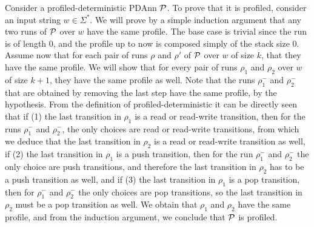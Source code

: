 %
%
%

Consider a profiled-deterministic PDAnn $\mathcal{P}$. To prove that it is profiled, consider an input string $w\in \Sigma^*$. We will prove by a simple induction argument that any two runs of $\mathcal{P}$ over $w$ have the same profile. The base case is trivial since the run is of length 0, and the profile up to now is composed simply of the stack size 0. Assume now that for each pair of runs $\rho$ and $\rho'$ of $\mathcal{P}$ over $w$ of size $k$, that they have the same profile. We will show that for every pair of runs $\rho_1$ and $\rho_2$ over $w$ of size $k+1$, they have the same profile as well. Note that the runs $\rho_1^-$ and $\rho_2^-$ that are obtained by removing the last step have the same profile, by the hypothesis. From the definition of profiled-deterministic it can be directly seen that if (1) the last transition in $\rho_1$ is a read or read-write transition, then for the runs $\rho_1^-$ and $\rho_2^-$, the only choices are read or read-write transitions, from which we deduce that the last transition in $\rho_2$ is a read or read-write transition as well, if (2) the last transition in $\rho_1$ is a push transition, then for the run $\rho_1^-$ and $\rho_2^-$ the only choice are push transitions, and therefore the last transition in $\rho_2$ has to be a push transition as well, and if (3) the last transition in $\rho_1$ is a pop transition, then for $\rho_1^-$ and $\rho_2^-$ the only choices are pop transitions, so the last transition in $\rho_2$ must be a pop transition as well. We obtain that $\rho_1$ and $\rho_2$ have the same profile, and from the induction argument, we conclude that $\mathcal{P}$ is profiled.

